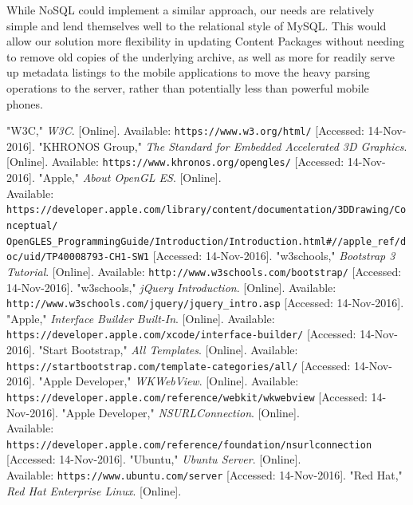\documentclass[letterpaper, 10pt,titlepage]{article}
\begin{document}
While NoSQL could implement a similar approach, our needs are relatively simple and lend themselves well to the relational style of MySQL. This would allow our solution more flexibility in updating Content Packages without needing to remove old copies of the underlying archive, as well as more for readily serve up metadata listings to the mobile applications to move the heavy parsing operations to the server, rather than potentially less than powerful mobile phones.




\newpage %
\begin{thebibliography}{22}

"W3C," \textit{W3C}. [Online]. Available:
\texttt{https://www.w3.org/html/} [Accessed: 14-Nov-2016].
"KHRONOS Group," \textit{The Standard for Embedded Accelerated 3D Graphics}. [Online]. Available:
\texttt{https://www.khronos.org/opengles/} [Accessed: 14-Nov-2016].
"Apple," \textit{About OpenGL ES}. [Online]. \\
Available:
\texttt{https://developer.apple.com/library/content/documentation/3DDrawing/Conceptual/\\OpenGLES\_ProgrammingGuide/Introduction/Introduction.html\#//apple\_ref/doc/uid/TP40008793-CH1-SW1} [Accessed: 14-Nov-2016].
"w3schools," \textit{Bootstrap 3 Tutorial}. [Online]. Available:
\texttt{http://www.w3schools.com/bootstrap/} [Accessed: 14-Nov-2016].
"w3schools," \textit{jQuery Introduction}. [Online]. Available:
\texttt{http://www.w3schools.com/jquery/jquery\_intro.asp} [Accessed: 14-Nov-2016].
"Apple," \textit{Interface Builder Built-In}. [Online]. Available:
\texttt{https://developer.apple.com/xcode/interface-builder/} [Accessed: 14-Nov-2016].
"Start Bootstrap," \textit{All Templates}. [Online]. Available:
\texttt{https://startbootstrap.com/template-categories/all/} [Accessed: 14-Nov-2016].
"Apple Developer," \textit{WKWebView}. [Online]. Available:
\texttt{https://developer.apple.com/reference/webkit/wkwebview} [Accessed: 14-Nov-2016].
"Apple Developer," \textit{NSURLConnection}. [Online]. 
\\Available: \texttt{https://developer.apple.com/reference/foundation/nsurlconnection} [Accessed: 14-Nov-2016].
"Ubuntu," \textit{Ubuntu Server}. [Online]. 
\\Available: \texttt{https://www.ubuntu.com/server} [Accessed: 14-Nov-2016].
"Red Hat," \textit{Red Hat Enterprise Linux}. [Online]. 

\end{thebibliography}
\end{document}
